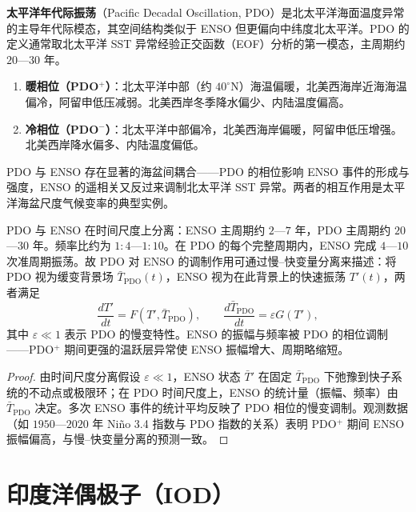 \begin{definition}\label{def:pdo}
\textbf{太平洋年代际振荡}（Pacific Decadal Oscillation, PDO）是北太平洋海面温度异常的主导年代际模态，其空间结构类似于 ENSO 但更偏向中纬度北太平洋。PDO 的定义通常取北太平洋 SST 异常经验正交函数（EOF）分析的第一模态，主周期约 $20$—$30$ 年。
\begin{enumerate}[label=(\roman*)]
    \item \textbf{暖相位（PDO$^+$）}：北太平洋中部（约 $40^\circ$N）海温偏暖，北美西海岸近海海温偏冷，阿留申低压减弱。北美西岸冬季降水偏少、内陆温度偏高。
    \item \textbf{冷相位（PDO$^-$）}：北太平洋中部偏冷，北美西海岸偏暖，阿留申低压增强。北美西岸降水偏多、内陆温度偏低。
\end{enumerate}
PDO 与 ENSO 存在显著的海盆间耦合——PDO 的相位影响 ENSO 事件的形成与强度，ENSO 的遥相关又反过来调制北太平洋 SST 异常。两者的相互作用是太平洋海盆尺度气候变率的典型实例。
\end{definition}

\begin{proposition}\label{prop:pdo_enso_separation}
PDO 与 ENSO 在时间尺度上分离：ENSO 主周期约 $2$—$7$ 年，PDO 主周期约 $20$—$30$ 年。频率比约为 $1:4$—$1:10$。在 PDO 的每个完整周期内，ENSO 完成 $4$—$10$ 次准周期振荡。故 PDO 对 ENSO 的调制作用可通过慢–快变量分离来描述：将 PDO 视为缓变背景场 $\bar{T}_{\text{PDO}}(t)$，ENSO 视为在此背景上的快速振荡 $T'(t)$，两者满足
\[
\frac{dT'}{dt} = F(T', \bar{T}_{\text{PDO}}), \qquad \frac{d\bar{T}_{\text{PDO}}}{dt} = \varepsilon G(T'),
\]
其中 $\varepsilon \ll 1$ 表示 PDO 的慢变特性。ENSO 的振幅与频率被 PDO 的相位调制——PDO$^+$ 期间更强的温跃层异常使 ENSO 振幅增大、周期略缩短。
\end{proposition}

\begin{proof}
由时间尺度分离假设 $\varepsilon \ll 1$，ENSO 状态 $\bar{T}'$ 在固定 $\bar{T}_{\text{PDO}}$ 下弛豫到快子系统的不动点或极限环；在 PDO 时间尺度上，ENSO 的统计量（振幅、频率）由 $\bar{T}_{\text{PDO}}$ 决定。多次 ENSO 事件的统计平均反映了 PDO 相位的慢变调制。观测数据（如 $1950$—$2020$ 年 Niño 3.4 指数与 PDO 指数的关系）表明 PDO$^+$ 期间 ENSO 振幅偏高，与慢–快变量分离的预测一致。
\end{proof}

\section{印度洋偶极子（IOD）}

